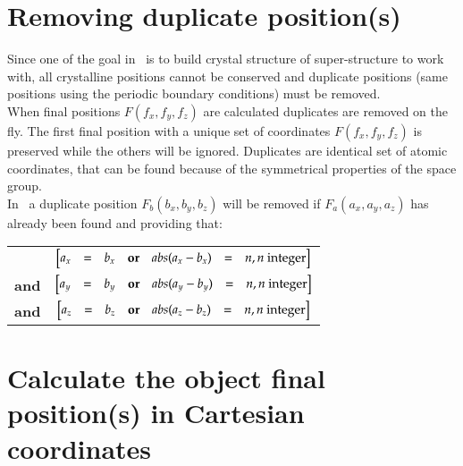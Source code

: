 \section*{Removing duplicate position(s)}

Since one of the goal in \atomes\ is to build crystal structure of super-structure to work with, 
all crystalline positions cannot be conserved and duplicate positions 
(same positions using the periodic boundary conditions) must be removed. \\
When final positions $F(f_x, f_y, f_z)$ are calculated duplicates are removed on the fly. 
The first final position with a unique set of coordinates $F(f_x, f_y, f_z)$ is preserved while the others will be ignored. 
Duplicates are identical set of atomic coordinates, that can be found because of the symmetrical properties of the space group. \\
In \atomes\ a duplicate position $F_b(b_x, b_y, b_z)$ will be removed if $F_a(a_x, a_y, a_z)$ has already been found and providing that:\\
\begin{center}
\begin{tabular}{lc}
 & $\begin{bmatrix} a_x & = & b_x & \bf{or} & abs(a_x - b_x) & = & n, n \text{ integer} \end{bmatrix} $ \\
 {\bf{and}} & $\begin{bmatrix} a_y & = & b_y & \bf{or} & abs(a_y - b_y) & = & n, n \text{ integer} \end{bmatrix}$ \\
 {\bf{and}} & $\begin{bmatrix}a_z & = & b_z & \bf{or} & abs(a_z - b_z) & = & n, n \text{ integer} \end{bmatrix}$
\end{tabular}
\end{center}

\section*{Calculate the object final position(s) in Cartesian coordinates}

